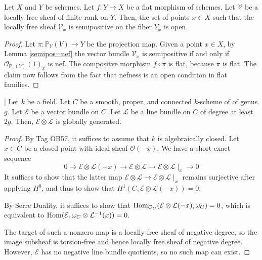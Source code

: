 \begin{lemma}\label{semipos_locus_open}
Let $X$ and $Y$ be schemes.
Let $f:Y\to X$ be a flat morphism of schemes.
Let $\mathcal{V}$ be a locally free sheaf of finite rank on $Y$.
Then, the set of points $x\in X$ such that the locally free sheaf $\mathcal{V}_x$ is semipositive on the fiber $Y_x$ is open.
\end{lemma}

\begin{proof}
Let $\pi:\mathbb{P}_Y(V)\to Y$ be the projection map.
Given a point $x\in X$, by Lemma \ref{semipos=nef} the vector bundle $\mathcal{V}_x$ is semipositive if and only if $\mathcal{O}_{\mathbb{P}_Y(V)}(1)_x$ is nef. 
The compositve morphism $f\circ \pi$ is flat, because $\pi$ is flat.
The claim now follows from the fact that nefness is an open condition in flat families.
\end{proof}

\begin{lemma}\label{global_generation_of_twist_on_curve}]
Let $k$ be a field.
Let $C$ be a smooth, proper, and connected $k$-scheme of of genus $g$.
Let $\mathcal{E}$ be a vector bundle on $C$. 
Let $\mathcal{L}$ be a line bundle on $C$ of degree at least $2g$. 
Then, $\mathcal{E}\otimes\mathcal{L}$ is globally generated.
\end{lemma}

\begin{proof}
By Tag OB57, it suffices to assume that $k$ is algebraically closed. 
Let $x\in C$ be a closed point with ideal sheaf $\mathcal{O}(-x)$. 
We have a short exact sequence
\begin{equation}
0\to\mathcal{E}\otimes\mathcal{L}(-x)\to\mathcal{E}\otimes\mathcal{L}\to\mathcal{E}\otimes\mathcal{L}\mid_x\to0
\end{equation}
It suffices to show that the latter map $\mathcal{E}\otimes\mathcal{L}\to\mathcal{E}\otimes\mathcal{L}\mid_x$ remains surjective after applying $H^0$, and thus to show that $H^1(C,\mathcal{E}\otimes\mathcal{L}(-x))=0$.

By Serre Duality, it suffices to show that $\mathop{\rm Hom}\nolimits_{\mathcal{O}_C}(\mathcal{E}\otimes\mathcal{L}(-x),\omega_C)=0$, which is equivalent to $\mathop{\rm Hom}\nolimits(\mathcal{E},\omega_C\otimes\mathcal{L}^{-1}(x))=0$.

The target of such a nonzero map is a locally free sheaf of negative degree, so the image subsheaf is torsion-free and hence locally free sheaf of negative degree. However, $\mathcal{E}$ has no negative line bundle quotients, so no such map can exist.
\end{proof}




